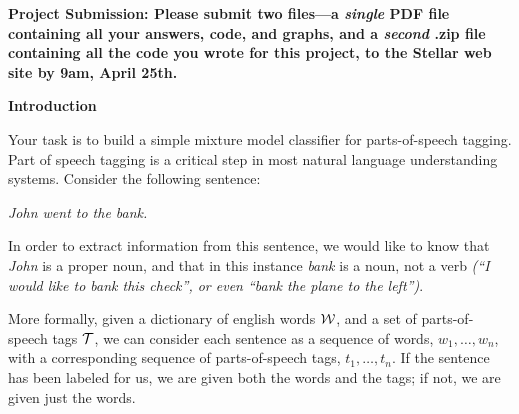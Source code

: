 

\usepackage[pdftex]{graphicx}
\usepackage{amsmath, amsthm, amssymb, amsfonts, mathtools, graphicx, enumerate}
\usepackage{times}
\usepackage{booktabs}
\usepackage{url}
\usepackage{enumerate}
\usepackage{enumitem}

\setlength{\parindent}{0pt}
\setlength{\parskip}{1ex}

\newcommand{\answer}[1]{{\mbox{}\color{red}{#1}}}
\newcommand{\emptycheck}{\text{(\hspace{-.75ex}(\hspace{3ex})\hspace{-.75ex})}}
\newcommand{\checkans}[1]{\text{(\hspace{-.75ex}(\hspace{1ex}{#1}\hspace{1ex})\hspace{-.75ex})}}
\newcommand{\argmax}{{\mbox{arg}\hspace{-.1ex}}\max}





{\bf Project Submission: Please submit two files---a \emph{single} PDF file containing all your answers, code, and graphs, and a
\emph{second} .zip file containing all the code you wrote for this
project, to
the Stellar web site by 9am, April 25th.}

\textbf{Introduction}

Your task is to build a simple mixture model classifier for parts-of-speech tagging. 
Part of speech tagging is a critical step in most natural language understanding
systems. Consider the following sentence:

\begin{center}\textit{John went to the bank.}\end{center}

In order to extract information from this sentence, we would like to know that
\textit{John} is a proper noun, and that in this instance \textit{bank} is a noun,
not a verb \textit{(``I would like to bank this check'', or even ``bank the plane
to the left'')}. 

More formally, given a dictionary of  english words ${\cal W}$, and a set of parts-of-speech
tags ${\cal T}$, 
we can consider each sentence as
a sequence of words, $w_1,\ldots,w_n$, with a
corresponding sequence of parts-of-speech tags, $t_1,\ldots,t_n$.
If the sentence has been labeled for us, we are
given both the words and the tags; if not, we are given just the words. 
 
